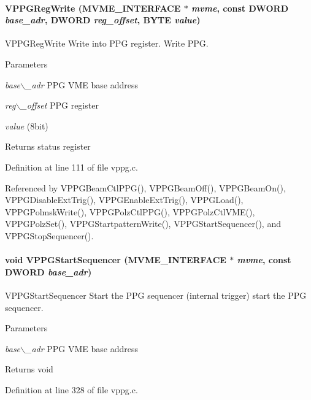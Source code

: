 \paragraph[{VPPGRegWrite}]{ VPPGRegWrite ({\bf MVME\_\-INTERFACE} $\ast$ {\em mvme}, \/  const {\bf DWORD} {\em base\_\-adr}, \/  {\bf DWORD} {\em reg\_\-offset}, \/  {\bf BYTE} {\em value})}\hfill\label{vppg_8h_a4f6ab8a9fcc14540cbd36f5d9313e8e8}
VPPGRegWrite Write into PPG register.  Write PPG. 
\begin{DoxyParams}{Parameters}
\item[{\em base$\backslash$\_\-adr}]PPG VME base address \item[{\em reg$\backslash$\_\-offset}]PPG register \item[{\em value}](8bit) \end{DoxyParams}
\begin{DoxyReturn}{Returns}
status register 
\end{DoxyReturn}


Definition at line 111 of file vppg.c.

Referenced by VPPGBeamCtlPPG(), VPPGBeamOff(), VPPGBeamOn(), VPPGDisableExtTrig(), VPPGEnableExtTrig(), VPPGLoad(), VPPGPolmskWrite(), VPPGPolzCtlPPG(), VPPGPolzCtlVME(), VPPGPolzSet(), VPPGStartpatternWrite(), VPPGStartSequencer(), and VPPGStopSequencer().
\paragraph[{VPPGStartSequencer}]{\setlength{\rightskip}{0pt plus 5cm}void VPPGStartSequencer ({\bf MVME\_\-INTERFACE} $\ast$ {\em mvme}, \/  const {\bf DWORD} {\em base\_\-adr})}\hfill\label{vppg_8h_aa631062dec5475b71398bf970501a81b}
VPPGStartSequencer Start the PPG sequencer (internal trigger)  start the PPG sequencer. 
\begin{DoxyParams}{Parameters}
\item[{\em base$\backslash$\_\-adr}]PPG VME base address \end{DoxyParams}
\begin{DoxyReturn}{Returns}
void 
\end{DoxyReturn}


Definition at line 328 of file vppg.c.
